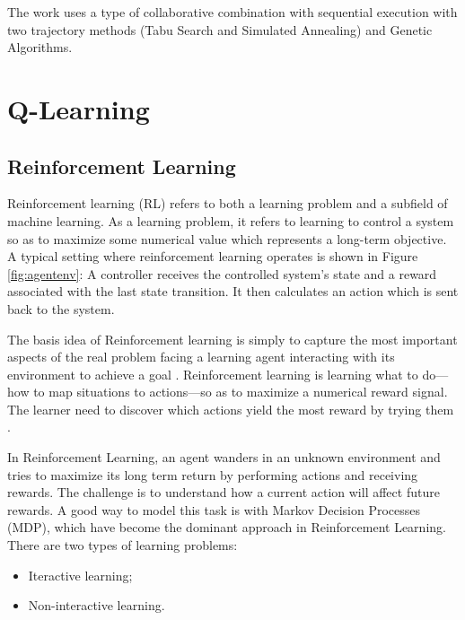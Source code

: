 The work uses a type of collaborative combination with sequential execution with two trajectory methods (Tabu Search and Simulated Annealing) and Genetic Algorithms.





\section{Q-Learning}




\subsection{Reinforcement Learning}

Reinforcement learning (RL) refers to both a learning problem and a subfield of machine
learning. As a learning problem, it refers to learning to control a system so as to maximize
some numerical value which represents a long-term objective. A typical setting where
reinforcement learning operates is shown in Figure \ref{fig:agentenv}: A controller receives the controlled
system’s state and a reward associated with the last state transition. It then calculates an
action which is sent back to the system.





The basis idea of Reinforcement learning  is simply to capture the most important aspects of the real problem facing a learning agent interacting with its environment to achieve a goal \cite{Sutton2012}. Reinforcement learning is learning what to do—how to map situations to actions—so as to maximize a numerical reward signal. The learner need to discover which actions yield the most reward by trying them \cite{Sutton2012}.

In Reinforcement Learning, an agent wanders in an unknown environment and tries to maximize its long term return by performing actions and receiving rewards. The challenge is to understand how a current action will affect future rewards. A good way to model this task is with Markov Decision Processes (MDP), which have become the dominant approach in Reinforcement Learning. There are two types of learning problems:

\begin{itemize}
\item Iteractive learning;
\item Non-interactive learning.
\end{itemize}

